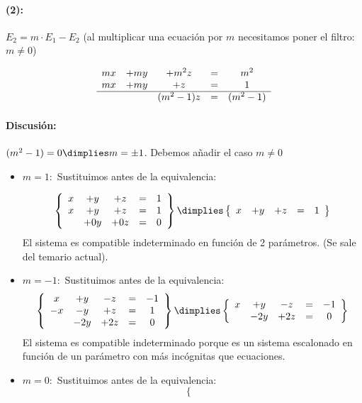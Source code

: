 \documentclass[palatino,nosec,nochap]{Docencia}
\begin{document}
\begin{problem}
\paragraph{(2):} $E_2 = m·E_1 - E_2$ (al multiplicar una ecuación por $m$ necesitamos poner el filtro: $m\neq 0$)

\[
	\begin{array}{ccccc}
		mx&+my&+m^2z&=&m^2\\
		mx&+my&+z&=&1\\
		\hline
		&&(m^2-1)z&=&(m^2-1)
	\end{array}
\]

\paragraph{Discusión:} $(m^2-1) = 0 \dimplies m=\pm 1$. Debemos añadir el caso $m\neq 0$

\begin{itemize}
	\item $m=1:$ Sustituimos antes de la equivalencia:

	\[
		\left\{
		\begin{array}{ccccc}
		x&+y&+z&=&1\\
		x&+y&+z&=&1\\
		&+0y&+0z&=&0
		\end{array}
		\right\} \dimplies 
		\left\{
			\begin{array}{ccccc}
			x&+y&+z&=&1\\
			\end{array}
		\right\} 
	\]
	El sistema es compatible indeterminado en función de 2 parámetros. (Se sale del temario actual).

	\item $m=-1:$ Sustituimos antes de la equivalencia:
	\[
		\left\{
		\begin{array}{ccccc}
		x&+y&-z&=&-1\\
		-x&-y&+z&=&1\\
		&-2y&+2z&=&0
		\end{array}
		\right\} \dimplies 
		\left\{
		\begin{array}{ccccc}
		x&+y&-z&=&-1\\
		&-2y&+2z&=&0
		\end{array}
		\right\}
	\]
	El sistema es compatible indeterminado porque es un sistema escalonado en función de un parámetro con más incógnitas que ecuaciones.
	
	\item $m=0:$ Sustituimos antes de la equivalencia:
	\[
		\left\{
		\begin{array}{ccccc}
		

\end{array}\]
\end{itemize}
\end{problem}
\end{document}
